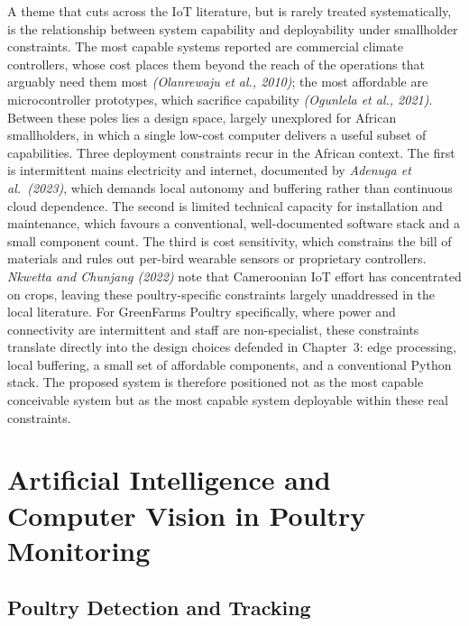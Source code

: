 \documentclass[12pt,a4paper]{report}
\begin{document}
A theme that cuts across the IoT literature, but is rarely treated systematically, is the relationship between system capability and deployability under smallholder constraints. The most capable systems reported are commercial climate controllers, whose cost places them beyond the reach of the operations that arguably need them most \textit{(Olanrewaju et al., 2010)}; the most affordable are microcontroller prototypes, which sacrifice capability \textit{(Ogunlela et al., 2021)}. Between these poles lies a design space, largely unexplored for African smallholders, in which a single low-cost computer delivers a useful subset of capabilities. Three deployment constraints recur in the African context. The first is intermittent mains electricity and internet, documented by \textit{Adenuga et al.\ (2023)}, which demands local autonomy and buffering rather than continuous cloud dependence. The second is limited technical capacity for installation and maintenance, which favours a conventional, well-documented software stack and a small component count. The third is cost sensitivity, which constrains the bill of materials and rules out per-bird wearable sensors or proprietary controllers. \textit{Nkwetta and Chunjang (2022)} note that Cameroonian IoT effort has concentrated on crops, leaving these poultry-specific constraints largely unaddressed in the local literature. For GreenFarms Poultry specifically, where power and connectivity are intermittent and staff are non-specialist, these constraints translate directly into the design choices defended in Chapter~3: edge processing, local buffering, a small set of affordable components, and a conventional Python stack. The proposed system is therefore positioned not as the most capable conceivable system but as the most capable system deployable within these real constraints.

\section{Artificial Intelligence and Computer Vision in Poultry Monitoring}

\subsection{Poultry Detection and Tracking}
\end{document}
